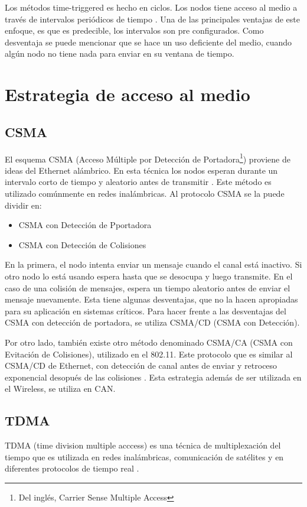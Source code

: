 Los métodos time-triggered es hecho en ciclos. Los nodos tiene acceso al medio a través de intervalos periódicos de tiempo \citep{Lisner07}. Una de las principales ventajas de este enfoque, es que es predecible, los intervalos son pre configurados. Como desventaja se puede mencionar que se hace un uso deficiente del medio, cuando algún nodo no tiene nada para enviar en su ventana de tiempo.

\section{Estrategia de acceso al medio}
\subsection{CSMA}
El esquema CSMA (Acceso Múltiple por Detección de Portadora\footnote{Del inglés, Carrier Sense Multiple Access}) proviene de ideas del Ethernet alámbrico. En esta técnica los nodos esperan durante un intervalo corto de tiempo y aleatorio antes de transmitir \citep{Tanenbaum03}. Este método es utilizado comúnmente en redes inalámbricas. Al protocolo CSMA se la puede dividir en:
\begin{itemize}
 \item CSMA con Detección de Pportadora
 \item CSMA con Detección de Colisiones
\end{itemize}

En la primera, el nodo intenta enviar un mensaje cuando el canal está inactivo. Si otro nodo lo está usando espera hasta que se desocupa y luego transmite. En el caso de una colisión de mensajes, espera un tiempo aleatorio antes de enviar el mensaje nuevamente. Esta tiene algunas desventajas, que no la hacen apropiadas para su aplicación en sistemas críticos. Para hacer frente a las desventajas del CSMA con detección de portadora, se utiliza CSMA/CD (CSMA con Detección).

Por otro lado, también existe otro método denominado CSMA/CA (CSMA con Evitación de Colisiones), utilizado en el 802.11. Este protocolo que es similar al CSMA/CD de Ethernet, con detección de canal antes de enviar y retroceso exponencial desopués de las colisiones \citep{Tanenbaum03}. Esta estrategia además de ser utilizada en el Wireless, se utiliza en CAN.

\subsection{TDMA}
TDMA (time division multiple acccess) es una técnica de multiplexación del tiempo que es utilizada en redes inalámbricas, comunicación de satélites y en diferentes protocolos de tiempo real \citep{Lisner07}.

